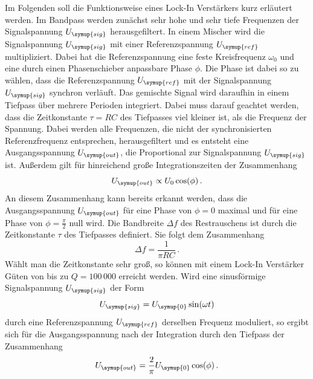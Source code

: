 Im Folgenden soll die Funktionsweise eines Lock-In Verstärkers kurz erläutert
werden. Im Bandpass werden zunächst sehr hohe und sehr tiefe Frequenzen der
Signalspannung $U_{\symup{sig}}$ herausgefiltert. In einem Mischer wird die
Signalspannung $U_{\symup{sig}}$ mit einer Referenzspannung $U_{\symup{ref}}$
multipliziert. Dabei hat die Referenzspannung eine feste Kreisfrequenz
$\omega_0$ und eine durch einen Phasenschieber anpassbare Phase $\phi$. Die Phase
ist dabei so zu wählen, dass die Referenzspannung $U_{\symup{ref}}$ mit der
Signalspannung $U_{\symup{sig}}$ synchron verläuft. Das gemischte Signal wird
daraufhin in einem Tiefpass über mehrere Perioden integriert. Dabei muss darauf
geachtet werden, dass  die Zeitkonstante $\tau=RC$ des Tiefpasses viel kleiner
ist, als die Frequenz der Spannung. Dabei werden alle Frequenzen, die nicht
der synchronisierten Referenzfrequenz entsprechen, herausgefiltert und es entsteht
eine Ausgangsspannung $U_{\symup{out}}$, die Proportional zur Signalspannung
$U_{\symup{sig}}$ ist. Außerdem gilt für hinreichend große Integrationszeiten
der Zusammenhang
\begin{equation}
  U_{\symup{out}}\propto U_0 \cos(\phi) \,.
  \label{eqn:U_out_prop}
\end{equation}
An diesem Zusammenhang kann bereits erkannt werden, dass die Ausgangsspannung
$U_{\symup{out}}$ für eine Phase von $\phi=0$ maximal und für eine Phase von
$\phi=\frac{\pi}{2}$ null wird.
Die Bandbreite $\Delta f$ des Restrauschens ist durch die Zeitkonstante $\tau$ des Tiefpasses
definiert. Sie folgt dem Zusammenhang
\begin{equation}
  \Delta f=\frac{1}{\pi R C} \,.
  \label{eqn:bandbreite}
\end{equation}
Wählt man die Zeitkonstante sehr groß, so können mit einem Lock-In Verstärker Güten
von bis zu $Q=100 \, 000$ erreicht werden.
Wird eine sinusförmige Signalspannung $U_{\symup{sig}}$ der Form
\begin{equation}
  U_{\symup{sig}}=U_{\symup{0}}\sin(\omega t)
\end{equation}
durch eine Referenzspannung $U_{\symup{ref}}$ derselben Frequenz moduliert, so
ergibt sich für die Ausgangsspannung nach der Integration durch den Tiefpass
der Zusammenhang
\begin{equation}
  U_{\symup{out}}=\frac{2}{\pi}U_{\symup{0}}\cos(\phi)\,.
\end{equation}
